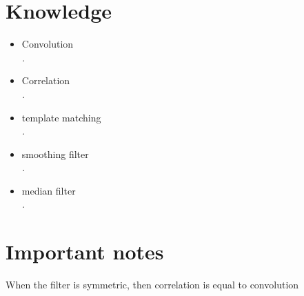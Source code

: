 \documentclass{article}
\begin{document}
\section{Knowledge}
\begin{itemize}
  \item Convolution\\
    \textit{.}
  \item Correlation\\
    \textit{.}
  \item template matching\\
    \textit{.}
  \item smoothing filter\\
    \textit{.}
  \item median filter\\
    \textit{.}
\end{itemize}

\section{Important notes}
When the filter is symmetric, then correlation is equal to convolution
\end{document}
